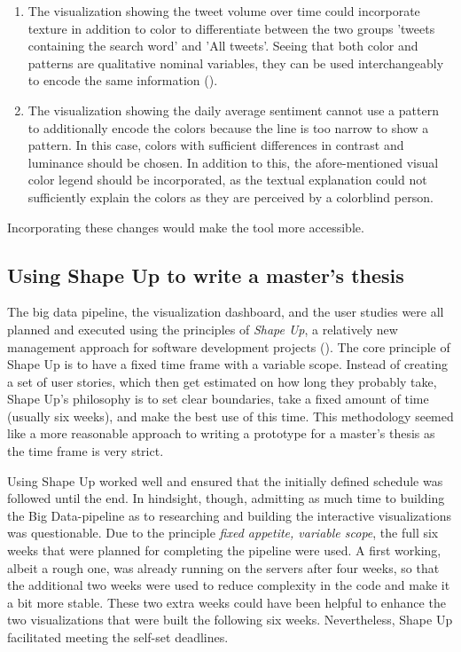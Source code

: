 \begin{enumerate}
    \item The visualization showing the tweet volume over time could incorporate texture in addition to color to differentiate between the two groups 'tweets containing the search word' and 'All tweets'. Seeing that both color and patterns are qualitative nominal variables, they can be used interchangeably to encode the same information (\cite{bornerDataVisualizationLiteracy2019}). %
    \item The visualization showing the daily average sentiment cannot use a pattern to additionally encode the colors because the line is too narrow to show a pattern. In this case, colors with sufficient differences in contrast and luminance should be chosen. In addition to this, the afore-mentioned visual color legend should be incorporated, as the textual explanation could not sufficiently explain the colors as they are perceived by a colorblind person.
\end{enumerate}

Incorporating these changes would make the tool more accessible.

\subsection*{Using Shape Up to write a master's thesis} \label{sec:shape_up}
The big data pipeline, the visualization dashboard, and the user studies were all planned and executed using the principles of \emph{Shape Up}, a relatively new management approach for software development projects (\cite{singerShapeStopRunning2019}). The core principle of Shape Up is to have a fixed time frame with a variable scope. Instead of creating a set of user stories, which then get estimated on how long they probably take, Shape Up's philosophy is to set clear boundaries, take a fixed amount of time (usually six weeks), and make the best use of this time. This methodology seemed like a more reasonable approach to writing a prototype for a master's thesis as the time frame is very strict.

Using Shape Up worked well and ensured that the initially defined schedule was followed until the end. In hindsight, though, admitting as much time to building the Big Data-pipeline as to researching and building the interactive visualizations was questionable. Due to the principle \emph{fixed appetite, variable scope}, the full six weeks that were planned for completing the pipeline were used. A first working, albeit a rough one, was already running on the   servers after four weeks, so that the additional two weeks were used to reduce complexity in the code and make it a bit more stable. These two extra weeks could have been helpful to enhance the two visualizations that were built the following six weeks. Nevertheless, Shape Up facilitated meeting the self-set deadlines.

